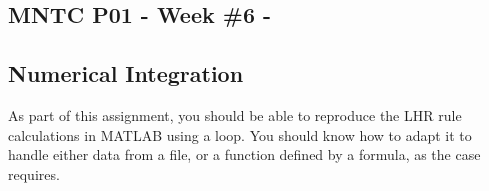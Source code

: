 


\usepackage{bbding} %


\newcommand{\ub}{\underbrace}

\begin{center}
\subsection*{MNTC P01 - Week \#6 - \WeekTitleSix}
\end{center}

\subsection*{Numerical Integration}

\begin{Question} As part of this assignment, you should be able to reproduce the
  LHR rule calculations in MATLAB using a loop. You should know how to
  adapt it to handle either data from a file, or a function defined by
  a formula, as the case requires.
\end{Question}

